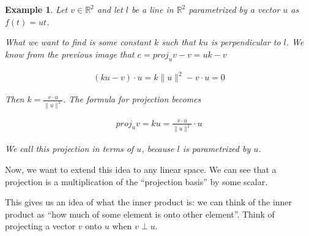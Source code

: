\documentclass{book}
\newtheorem{example}{Example}[chapter]
\begin{document}
\begin{example}
    Let $v\in\mathbb{R}^{2}$ and let $l$ be a line
    in $\mathbb{R}^{2}$ parametrized by a vector $u$ as $f(t)=ut$.

    \begin{center}
    \end{center}

    What we want to find is some constant $k$ such that $ku$ is perpendicular to
    $l$. We know from the previous image that $e=proj_u v - v = uk-v$

    \begin{equation*}
        \begin{split}
            (ku-v)\cdot u = k\|u\|^{2} - v\cdot u = 0
        \end{split}
    \end{equation*}

    Then $k=\frac{v\cdot u}{\|u\|^{2}}$. The formula for projection becomes

    \begin{equation}
        \begin{split}
            proj_u v = ku = \frac{v\cdot u}{\|u\|^{2}}\cdot u
        \end{split}
    \end{equation}

    We call this projection in terms of $u$, because $l$ is parametrized by $u$.
\end{example}

Now, we want to extend this idea to any linear space. We can see that a
projection is a multiplication of the ``projection basis'' by some scalar.

This gives us an idea of what the inner product is: we can think of the inner
product as ``how much of some element is onto other element''. Think of
projecting a vector $v$ onto $u$ when $v\perp u$.
\end{document}
